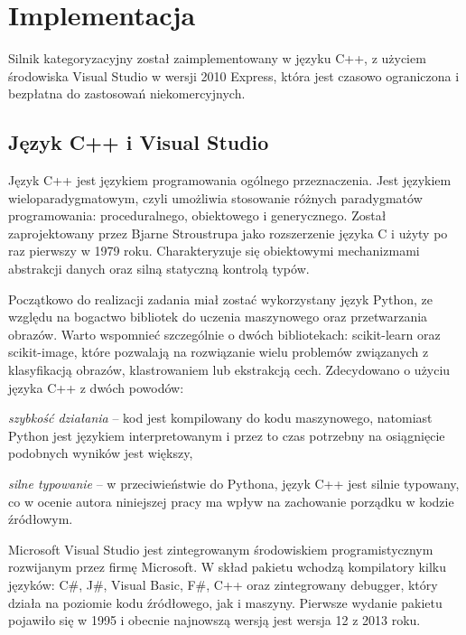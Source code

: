\chapter{Implementacja}

Silnik kategoryzacyjny został zaimplementowany w języku C++, z użyciem środowiska Visual Studio w wersji 2010 Express, która jest czasowo ograniczona i bezpłatna do zastosowań niekomercyjnych.

\section{Język C++ i Visual Studio}

Język C++ jest językiem programowania ogólnego przeznaczenia. Jest językiem wieloparadygmatowym, czyli umożliwia stosowanie różnych paradygmatów programowania: proceduralnego, obiektowego i generycznego. Został zaprojektowany przez Bjarne Stroustrupa jako rozszerzenie języka C i użyty po raz pierwszy w 1979 roku. Charakteryzuje się obiektowymi mechanizmami abstrakcji danych oraz silną statyczną kontrolą typów.

Początkowo do realizacji zadania miał zostać wykorzystany język Python, ze względu na bogactwo bibliotek do uczenia maszynowego oraz przetwarzania obrazów. Warto wspomnieć szczególnie o dwóch bibliotekach: scikit-learn oraz scikit-image, które pozwalają na rozwiązanie wielu problemów związanych z klasyfikacją obrazów, klastrowaniem lub ekstrakcją cech. Zdecydowano o użyciu języka C++ z dwóch powodów:

\begin{compactitem}
	\item \emph{szybkość działania} -- kod jest kompilowany do kodu maszynowego, natomiast Python jest językiem interpretowanym i przez to czas potrzebny na osiągnięcie podobnych wyników jest większy,
	\item \emph{silne typowanie} -- w przeciwieństwie do Pythona, język C++ jest silnie typowany, co w ocenie autora niniejszej pracy ma wpływ na zachowanie porządku w kodzie źródłowym.
\end{compactitem}

Microsoft Visual Studio jest zintegrowanym środowiskiem programistycznym rozwijanym przez firmę Microsoft. W skład pakietu wchodzą kompilatory kilku języków: C\#, J\#, Visual Basic, F\#, C++ oraz zintegrowany debugger, który działa na poziomie kodu źródłowego, jak i maszyny. Pierwsze wydanie pakietu pojawiło się w 1995 i obecnie najnowszą wersją jest wersja 12 z 2013 roku. 


